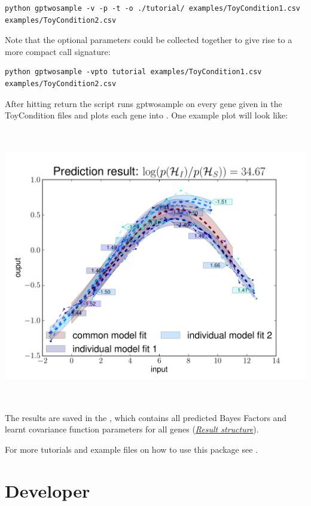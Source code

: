 \documentclass[letterpaper,10pt,english]{sphinxmanual}
\begin{document}
\begin{Verbatim}[commandchars=\\\{\}]
python gptwosample -v -p -t -o ./tutorial/ examples/ToyCondition1.csv examples/ToyCondition2.csv
\end{Verbatim}

Note that the optional parameters could be collected together to give
rise to a more compact call signature:

\begin{Verbatim}[commandchars=\\\{\}]
python gptwosample -vpto tutorial examples/ToyCondition1.csv
examples/ToyCondition2.csv
\end{Verbatim}

After hitting return the script runs gptwosample on every gene given
in the ToyCondition files and plots each gene into
. One example plot will look like:

\includegraphics[height=12cm]{timeshiftexample.pdf}

The results are saved in the , which contains all
predicted Bayes Factors and learnt covariance function parameters for
all genes ({\hyperref[results:results]{\emph{Result structure}}}).

For more tutorials and example files on how to use this package see
.


\chapter{Developer}
\label{index:developer}\label{base:module-gptwosample}
\end{document}
